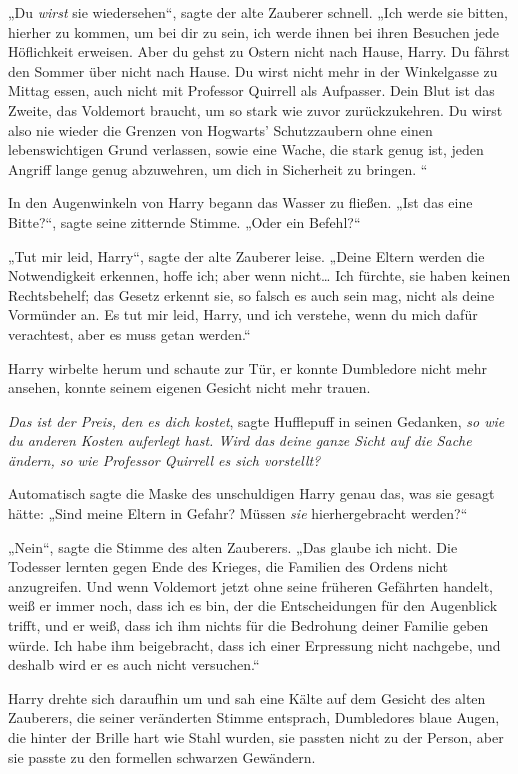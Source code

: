 {„Du \emph{wirst} sie wiedersehen“, sagte der alte Zauberer schnell. „Ich werde sie bitten, hierher zu kommen, um bei dir zu sein, ich werde ihnen bei ihren Besuchen jede Höflichkeit erweisen. Aber du gehst zu Ostern nicht nach Hause, Harry. Du fährst den Sommer über nicht nach Hause. Du wirst nicht mehr in der Winkelgasse zu Mittag essen, auch nicht mit Professor Quirrell als Aufpasser. Dein Blut ist das Zweite, das Voldemort braucht, um so stark wie zuvor zurückzukehren. Du wirst also nie wieder die Grenzen von Hogwarts' Schutzzaubern ohne einen lebenswichtigen Grund verlassen, sowie eine Wache, die stark genug ist, jeden Angriff lange genug abzuwehren, um dich in Sicherheit zu bringen. “

In den Augenwinkeln von Harry begann das Wasser zu fließen. „Ist das eine Bitte?“, sagte seine zitternde Stimme. „Oder ein Befehl?“

„Tut mir leid, Harry“, sagte der alte Zauberer leise. „Deine Eltern werden die Notwendigkeit erkennen, hoffe ich; aber wenn nicht… Ich fürchte, sie haben keinen Rechtsbehelf; das Gesetz erkennt sie, so falsch es auch sein mag, nicht als deine Vormünder an. Es tut mir leid, Harry, und ich verstehe, wenn du mich dafür verachtest, aber es muss getan werden.“

Harry wirbelte herum und schaute zur Tür, er konnte Dumbledore nicht mehr ansehen, konnte seinem eigenen Gesicht nicht mehr trauen.

\emph{Das ist der Preis,} \emph{den es dich kostet}, sagte Hufflepuff in seinen Gedanken, \emph{so wie} \emph{du anderen Kosten auferlegt hast. Wird das} \emph{deine} \emph{ganze Sicht auf die Sache ändern, so wie Professor Quirrell es sich vorstellt?}

Automatisch sagte die Maske des unschuldigen Harry genau das, was sie gesagt hätte: „Sind meine Eltern in Gefahr? Müssen \emph{sie} hierhergebracht werden?“

„Nein“, sagte die Stimme des alten Zauberers. „Das glaube ich nicht. Die Todesser lernten gegen Ende des Krieges, die Familien des Ordens nicht anzugreifen. Und wenn Voldemort jetzt ohne seine früheren Gefährten handelt, weiß er immer noch, dass ich es bin, der die Entscheidungen für den Augenblick trifft, und er weiß, dass ich ihm nichts für die Bedrohung deiner Familie geben würde. Ich habe ihm beigebracht, dass ich einer Erpressung nicht nachgebe, und deshalb wird er es auch nicht versuchen.“

Harry drehte sich daraufhin um und sah eine Kälte auf dem Gesicht des alten Zauberers, die seiner veränderten Stimme entsprach, Dumbledores blaue Augen, die hinter der Brille hart wie Stahl wurden, sie passten nicht zu der Person, aber sie passte zu den formellen schwarzen Gewändern.

}

